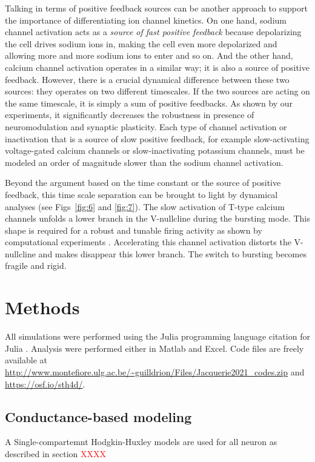 Talking in terms of positive feedback sources can be another approach to support the importance of differentiating  ion channel kinetics. On one hand, sodium channel activation acts as a \textit{source of fast positive feedback} because depolarizing the cell drives sodium ions in, making the cell even more depolarized and allowing more and more sodium ions to enter and so on. And the other hand, calcium channel activation operates in a similar way; it is also a source of positive feedback. However, there is a crucial dynamical difference between these two sources: they operates on two different timescales. If the two sources are acting on the same timescale, it is simply a sum of positive feedbacks. As shown by our experiments, it significantly decreases the robustness in presence of neuromodulation and synaptic plasticity. Each type of channel activation or inactivation that is a source of slow positive feedback, for example slow-activating voltage-gated calcium channels or slow-inactivating potassium channels, must be modeled an order of magnitude slower than the sodium channel activation.

Beyond the argument based on the time constant or the source of positive feedback, this time scale separation can be  brought to light by dynamical analyses (see Figs~\ref{fig:6} and \ref{fig:7}). The slow activation of T-type calcium channels unfolds a lower branch in the V-nullcline during the bursting mode. This shape is required for a robust and tunable firing activity as shown by computational experiments \citep{drion_novel_2012, franci_balance_2013, franci_modeling_2014, franci_robust_2018, van_pottelbergh_robust_2018}.  Accelerating this channel activation distorts the V-nullcline and makes disappear this lower branch.  The switch to bursting becomes fragile and rigid.


\section{Methods}
\label{sec:methods}
All simulations were performed using the Julia programming language citation for Julia \citep{bezanson_julia_2017}. Analysis were performed either in Matlab and Excel. Code files are freely available at \url{http://www.montefiore.ulg.ac.be/~guilldrion/Files/Jacquerie2021_codes.zip} and \url{https://osf.io/sth4d/}.

\subsection{Conductance-based modeling}
A Single-compartemnt Hodgkin-Huxley models are used for all neuron as described in section \textcolor{red}{XXXX}


